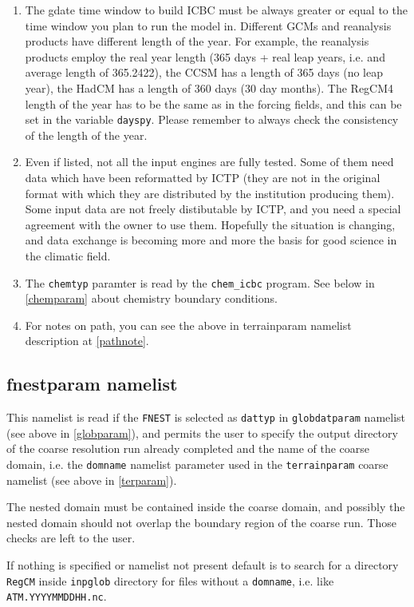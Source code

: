 \begin{enumerate}
\item The gdate time window to build ICBC must be always greater or equal to
the time window you plan to run the model in.
Different GCMs and reanalysis products have different length of the year.
For example, the reanalysis products employ the real year length (365 days +
real leap years, i.e. and average length of 365.2422), the CCSM has a length
of 365 days (no leap year), the HadCM has a length of 360 days (30 day months).
The RegCM4 length of the year has to be the same as in the forcing fields, and
this can be set in the variable \verb=dayspy=.
Please remember to always check the consistency of the length of the year.
\item Even if listed, not all the input engines are fully tested. Some of them
need data which have been reformatted by ICTP (they are not in the original
format with which they are distributed by the institution producing them).
Some input data are not freely distibutable by ICTP, and you need a special
agreement with the owner to use them.
Hopefully the situation is changing, and data exchange is becoming more and more
the basis for good science in the climatic field.
\item The \verb=chemtyp= paramter is read by the \verb=chem_icbc= program.
See below in \ref{chemparam} about chemistry boundary conditions.
\item For notes on path, you can see the above in terrainparam namelist
description at \ref{pathnote}.
\end{enumerate}

\subsection{fnestparam namelist}

This namelist is read if the \verb=FNEST= is selected as \verb=dattyp= in
\verb=globdatparam= namelist (see above in \ref{globparam}), and permits
the user to specify the output directory of the coarse resolution run
already completed and the name of the coarse domain, i.e. the \verb=domname=
namelist parameter used in the \verb=terrainparam= coarse namelist
(see above in \ref{terparam}).

The nested domain must be contained inside the coarse domain, and possibly
the nested domain should not overlap the boundary region of the coarse run.
Those checks are left to the user.

If nothing is specified or namelist not present default is to search for
a directory \verb=RegCM= inside \verb=inpglob= directory for files without
a \verb=domname=, i.e. like \verb=ATM.YYYYMMDDHH.nc=.

